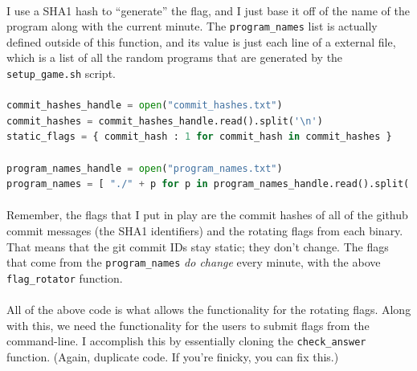\documentclass[11pt]{article}
\begin{document}
	\paragraph{} I use a SHA1 hash to ``generate'' the flag, and I just base it off of the name of the program along with the current minute. The \texttt{program\_names} list is actually defined outside of this function, and its value is just each line of a external file, which is a list of all the random programs that are generated by the \texttt{setup\_game.sh} script.

	\paragraph{}

	\begin{lstlisting}[language=Python]
commit_hashes_handle = open("commit_hashes.txt")
commit_hashes = commit_hashes_handle.read().split('\n')
static_flags = { commit_hash : 1 for commit_hash in commit_hashes }

program_names_handle = open("program_names.txt")
program_names = [ "./" + p for p in program_names_handle.read().split('\n') ];
	\end{lstlisting}

	\paragraph{} Remember, the flags that I put in play are the commit hashes of all of the github commit messages (the SHA1 identifiers) and the rotating flags from each binary. That means that the git commit IDs stay static; they don't change. The flags that come from the \texttt{program\_names} \textit{do change} every minute, with the above \texttt{flag\_rotator} function.

	\paragraph{} All of the above code is what allows the functionality for the rotating flags. Along with this, we need the functionality for the users to submit flags from the command-line. I accomplish this by essentially cloning the \texttt{check\_answer} function. (Again, duplicate code. If you're finicky, you can fix this.)

	\begin{center}
		\graphicspath{ {.} }
		\centering
	\end{center}
\end{document}
